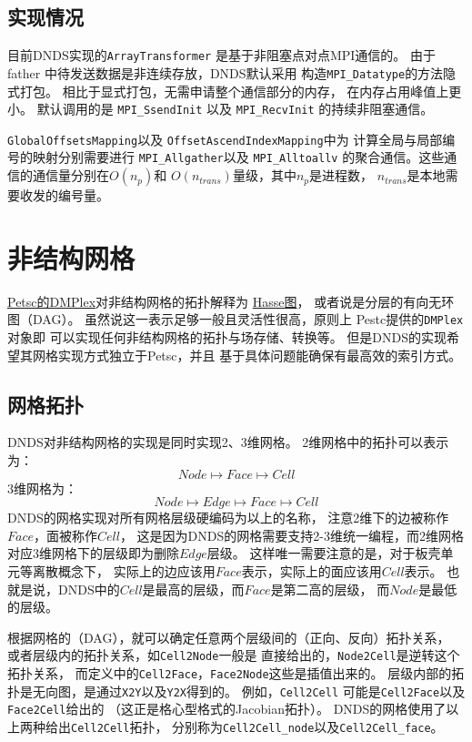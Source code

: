 \documentclass[UTF8,zihao=5]{ctexart} %
\begin{document}
\subsection{实现情况}

目前DNDS实现的\verb|ArrayTransformer|
是基于非阻塞点对点MPI通信的。
由于father
中待发送数据是非连续存放，DNDS默认采用
构造\verb|MPI_Datatype|的方法隐式打包。
相比于显式打包，无需申请整个通信部分的内存，
在内存占用峰值上更小。
默认调用的是
\verb|MPI_SsendInit|
以及
\verb|MPI_RecvInit|
的持续非阻塞通信。

\verb|GlobalOffsetsMapping|以及
\verb|OffsetAscendIndexMapping|中为
计算全局与局部编号的映射分别需要进行
\verb|MPI_Allgather|以及
\verb|MPI_Alltoallv|
的聚合通信。这些通信的通信量分别在$O(n_p)$和
$O(n_{trans})$量级，其中$n_p$是进程数，
$n_{trans}$是本地需要收发的编号量。

\section{非结构网格}

\href{https://petsc.org/release/manual/dmplex/}
{Petsc的DMPlex}对非结构网格的拓扑解释为
\href{https://en.wikipedia.org/wiki/Hasse_diagram}{Hasse图}，
或者说是分层的有向无环图（DAG）。
虽然说这一表示足够一般且灵活性很高，原则上
Pestc提供的\verb|DMPlex|对象即
可以实现任何非结构网格的拓扑与场存储、转换等。
但是DNDS的实现希望其网格实现方式独立于Petsc，并且
基于具体问题能确保有最高效的索引方式。


\subsection{网格拓扑}

DNDS对非结构网格的实现是同时实现2、3维网格。
2维网格中的拓扑可以表示为：
$$
Node\mapsto Face\mapsto Cell
$$
3维网格为：
$$
Node\mapsto Edge \mapsto Face\mapsto Cell
$$
DNDS的网格实现对所有网格层级硬编码为以上的名称，
注意2维下的边被称作$Face$，面被称作$Cell$，
这是因为DNDS的网格需要支持2-3维统一编程，而2维网格
对应3维网格下的层级即为删除$Edge$层级。
这样唯一需要注意的是，对于板壳单元等离散概念下，
实际上的边应该用$Face$表示，实际上的面应该用$Cell$表示。
也就是说，DNDS中的$Cell$是最高的层级，而$Face$是第二高的层级，
而$Node$是最低的层级。

根据网格的（DAG），就可以确定任意两个层级间的（正向、反向）拓扑关系，
或者层级内的拓扑关系，如\verb|Cell2Node|一般是
直接给出的，\verb|Node2Cell|是逆转这个拓扑关系，
而定义中的\verb|Cell2Face|，\verb|Face2Node|这些是插值出来的。
层级内部的拓扑是无向图，是通过\verb|X2Y|以及\verb|Y2X|得到的。
例如，\verb|Cell2Cell|
可能是\verb|Cell2Face|以及\verb|Face2Cell|给出的
（这正是格心型格式的Jacobian拓扑）。
DNDS的网格使用了以上两种给出\verb|Cell2Cell|拓扑，
分别称为\verb|Cell2Cell_node|以及\verb|Cell2Cell_face|。
\end{document}

